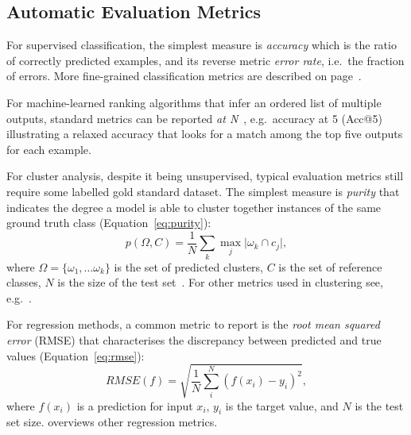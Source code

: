 \subsection{Automatic Evaluation Metrics}
For supervised classification, the simplest measure is \emph{accuracy} which is the ratio of correctly predicted examples, and its reverse metric \emph{error rate}, i.e.\ the fraction of errors.
%
More fine-grained classification metrics are described
on page~\pageref{ch:confusion-matrix}.

For machine-learned ranking algorithms
that infer an ordered list of multiple outputs, standard metrics can be reported \emph{at N}~\citep{Herlocker2004},
e.g.\
accuracy at 5 (Acc@5) illustrating a relaxed accuracy that looks for a match among the top five outputs for each example.

For cluster analysis, despite it being unsupervised, typical evaluation metrics still require some labelled gold standard dataset.
The simplest measure is \emph{purity}\index{evaluation methods!purity} that indicates the degree
a model is able to cluster together instances of the same ground truth class (Equation~\ref{eq:purity}):
\begin{equation}
    \label{eq:purity}
    p(\Omega, C) = \frac{1}{N} \sum_{k} \max_j \lvert \omega_k \cap c_j \rvert,
\end{equation}
where $\Omega=\{\omega_1,\ldots\omega_k\}$ is the set of predicted clusters, $C$ is the set of reference classes, $N$ is the size of the test set~\citep{Manning2008}.
For other metrics used in clustering see, e.g.~\citet{Friedman2001}.

For regression methods, a common metric to report is the
\emph{root mean squared error} (RMSE) that characterises the discrepancy between predicted and true values (Equation~\ref{eq:rmse}):
\begin{equation}
    \label{eq:rmse}
    RMSE(f) = \sqrt{\frac{1}{N} \sum_i^N (f(x_i) - y_i)^2},
\end{equation}
where $f(x_i)$ is a prediction for input $x_i$, $y_i$ is the target value, and $N$ is the test set size.
\citet{Harrell2015} overviews other regression metrics.

